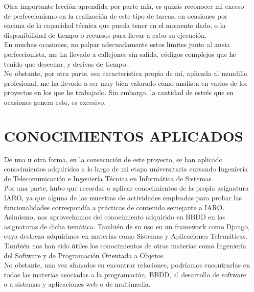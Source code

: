 Otra importante lección aprendida por parte mía, es quizás reconocer mi exceso de perfeccionismo en la realización de este tipo de tareas, en ocasiones por encima de la capacidad técnica que pueda tener en el momento dado, o la disponibilidad de tiempo o recursos para llevar a cabo su ejecución.\\


En muchas ocasiones, no palpar adecuadamente estos límites junto al ansia perfeccionista, me ha llevado a callejones sin salida, códigos complejos que he tenido que desechar, y derivas de tiempo.\\


No obstante, por otra parte, esa característica propia de mí, aplicada al mundillo profesional, me ha llevado a ser muy bien valorado como analista en varios de los proyectos en los que he trabajado. Sin embargo, la cantidad de estrés que en ocasiones genera esto, es excesivo.\\

\newpage
\section{CONOCIMIENTOS APLICADOS}

De una u otra forma, en la consecución de este proyecto, se han aplicado conocimientos adquiridos a lo largo de mi etapa universitaria cursando Ingeniería de Telecomunicación e Ingeniería Técnica en Informática de Sistemas.\\


Por una parte, hubo que recordar o aplicar conocimientos de la propia asignatura IARO, ya que alguna de las muestras de actividades empleadas para probar las funcionalidades correspondía a prácticas de contenido semejante a IARO.\\


Asimismo, nos aprovechamos del conocimiento adquirido en BBDD en las asignaturas de dicha temática. También de su uso en un framework como Django, cuya destreza adquirimos en materias como Sistemas y Aplicaciones Telemáticas.\\


También nos han sido útiles los conocimientos de otras materias como Ingeniería del Software y de Programación Orientada a Objetos.\\


No obstante, una vez afanados en encontrar relaciones, podríamos encontrarlas en todas las materias asociadas a la programación, BBDD, al desarrollo de software o a sistemas y aplicaciones web o de multimedia.\\

